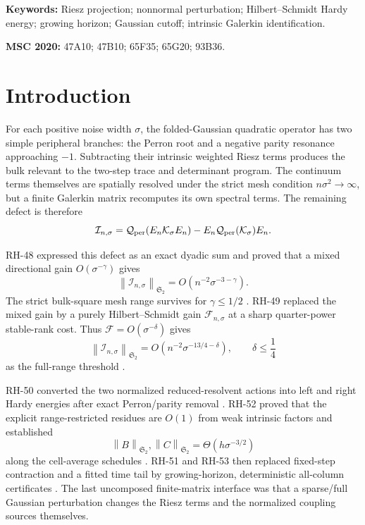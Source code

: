 \documentclass[11pt]{article}
\theoremstyle{definition}
\theoremstyle{remark}
\newcommand{\HS}{\mathfrak S_2}
\newcommand{\cF}{\mathcal F}
\newcommand{\cI}{\mathcal I}
\newcommand{\cQ}{\mathcal Q}
\newcommand{\norm}[1]{\left\lVert #1\right\rVert}
\begin{document}
\noindent\textbf{Keywords:} Riesz projection; nonnormal perturbation;
Hilbert--Schmidt Hardy energy; growing horizon; Gaussian cutoff; intrinsic
Galerkin identification.

\noindent\textbf{MSC 2020:} 47A10; 47B10; 65F35; 65G20; 93B36.

\section{Introduction}

For each positive noise width $\sigma$, the folded-Gaussian quadratic
operator has two simple peripheral branches: the Perron root and a negative
parity resonance approaching $-1$.  Subtracting their intrinsic weighted
Riesz terms produces the bulk relevant to the two-step trace and determinant
program.  The continuum terms themselves are spatially resolved under the
strict mesh condition $n\sigma^2\to\infty$, but a finite Galerkin matrix
recomputes its own spectral terms.  The remaining defect is therefore
\[
 \cI_{n,\sigma}
 =\cQ_{\rm per}(E_n\mathcal K_\sigma E_n)
  -E_n\cQ_{\rm per}(\mathcal K_\sigma)E_n.
\]

RH-48 expressed this defect as an exact dyadic sum and proved that a mixed
directional gain $O(\sigma^{-\gamma})$ gives
\begin{equation}
 \norm{\cI_{n,\sigma}}_{\HS}
 =O(n^{-2}\sigma^{-3-\gamma}).
 \label{eq:rh48}
\end{equation}
The strict bulk-square mesh range survives for $\gamma\le1/2$
\citep{WangIntrinsic2026}.  RH-49 replaced the mixed gain by a purely
Hilbert--Schmidt gain $\cF_{n,\sigma}$ at a sharp quarter-power stable-rank
cost.  Thus $\cF=O(\sigma^{-\delta})$ gives
\begin{equation}
 \norm{\cI_{n,\sigma}}_{\HS}
 =O(n^{-2}\sigma^{-13/4-\delta}),
 \qquad \delta\le\frac14
 \label{eq:rh49}
\end{equation}
as the full-range threshold \citep{WangDirectional2026}.

RH-50 converted the two normalized reduced-resolvent actions into left and
right Hardy energies after exact Perron/parity removal
\citep{WangHardy2026}.  RH-52 proved that the explicit range-restricted
residues are $O(1)$ from weak intrinsic factors and established
\begin{equation}
 \norm B_{\HS},\norm C_{\HS}
 =\Theta(h\sigma^{-3/2})
 \label{eq:coupling-scale}
\end{equation}
along the cell-average schedules \citep{WangFactorTransfer2026}.  RH-51 and
RH-53 then replaced fixed-step contraction and a fitted time tail by
growing-horizon, deterministic all-column certificates
\citep{WangStructuredStein2026,WangHardyTail2026}.  The last uncomposed
finite-matrix interface was that a sparse/full Gaussian perturbation changes
the Riesz terms and the normalized coupling sources themselves.
\end{document}
